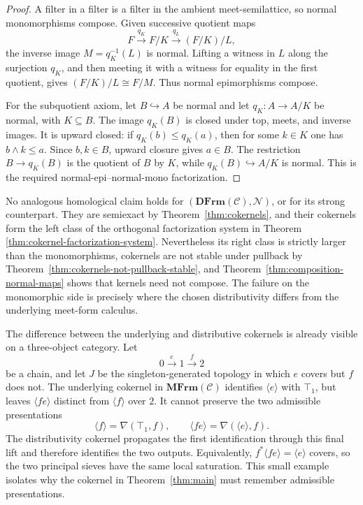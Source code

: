 \documentclass[12pt,oneside,reqno]{amsart}
\theoremstyle{definition}
\theoremstyle{remark}
\newcommand{\C}{\mathcal C}
\newcommand{\MFrm}{\mathbf{MFrm}}
\newcommand{\DFrm}{\mathbf{DFrm}}
\newcommand{\Null}{\mathcal N}
\newcommand{\prin}[1]{\langle #1\rangle}
\begin{document}
\begin{proof}
A filter in a filter is a filter in the ambient meet-semilattice, so
normal monomorphisms compose.  Given successive quotient maps
\[
 F\xrightarrow{q_K}F/K\xrightarrow{q_L}(F/K)/L,
\]
the inverse image \(M=q_K^{-1}(L)\) is normal.  Lifting a witness in
\(L\) along the surjection \(q_K\), and then meeting it with a witness
for equality in the first quotient, gives
\((F/K)/L\cong F/M\).  Thus normal epimorphisms compose.

For the subquotient axiom, let \(B\hookrightarrow A\) be normal and let
\(q_K:A\to A/K\) be normal, with \(K\subseteq B\).  The image
\(q_K(B)\) is closed under top, meets, and inverse images.  It is upward
closed: if \(q_K(b)\leqslant q_K(a)\), then for some \(k\in K\) one has
\(b\wedge k\leqslant a\).  Since \(b,k\in B\), upward closure gives
\(a\in B\).  The restriction \(B\to q_K(B)\) is the quotient of
\(B\) by \(K\), while \(q_K(B)\hookrightarrow A/K\) is normal.  This
is the required normal-epi--normal-mono factorization.
\end{proof}

No analogous homological claim holds for
\((\DFrm(\C),\Null)\), or for its strong counterpart.  They are
semiexact by Theorem~\ref{thm:cokernels}, and their cokernels form the
left class of the orthogonal factorization system in Theorem
\ref{thm:cokernel-factorization-system}.  Nevertheless its right class
is strictly larger than the monomorphisms, cokernels are not stable
under pullback by Theorem~\ref{thm:cokernels-not-pullback-stable}, and
Theorem~\ref{thm:composition-normal-maps} shows that kernels need not
compose.  The failure on the monomorphic side is precisely where the
chosen distributivity differs from the underlying meet-form calculus.

The difference between the underlying and distributive cokernels is
already visible on a three-object category.  Let
\[
                     0\xrightarrow{e}1\xrightarrow{f}2
\]
be a chain, and let \(J\) be the singleton-generated topology in which
\(e\) covers but \(f\) does not.  The underlying cokernel in
\(\MFrm(\C)\) identifies \(\prin e\) with \(\top_1\), but leaves
\(\prin{fe}\) distinct from \(\prin f\) over \(2\).  It cannot preserve
the two admissible presentations
\[
 \prin f=\nabla(\top_1,f),
 \qquad
 \prin{fe}=\nabla(\prin e,f).
\]
The distributivity cokernel propagates the first identification through
this final lift and therefore identifies the two outputs.  Equivalently,
\(f^*\prin{fe}=\prin e\) covers, so the two principal sieves have the
same local saturation.  This small example isolates why the cokernel in
Theorem~\ref{thm:main} must remember admissible presentations.
\end{document}
